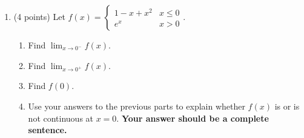\documentclass[12pt]{article}
\renewcommand{\d}{\displaystyle}
\begin{document}
\begin{enumerate}
	
\item (4 points) Let $f(x)=\begin{cases} 1-x+x^{2} & x \leq 0\\e^x & x > 0 \end{cases}.$ 
\begin{enumerate}
	\item Find $\d \lim_{x \to 0^-} f(x).$
	\vspace{.5in}
	\item Find $\d \lim_{x \to 0^+} f(x).$
	\vspace{.5in}
	\item Find $f(0)$.
	\vspace{.5in}
	\item Use your answers to the previous parts to explain whether $f(x)$ is or is not continuous at $x=0.$ {\bf Your answer should be a complete sentence.}
	\vspace{.5in}
\end{enumerate}
\end{enumerate}
\end{document}
